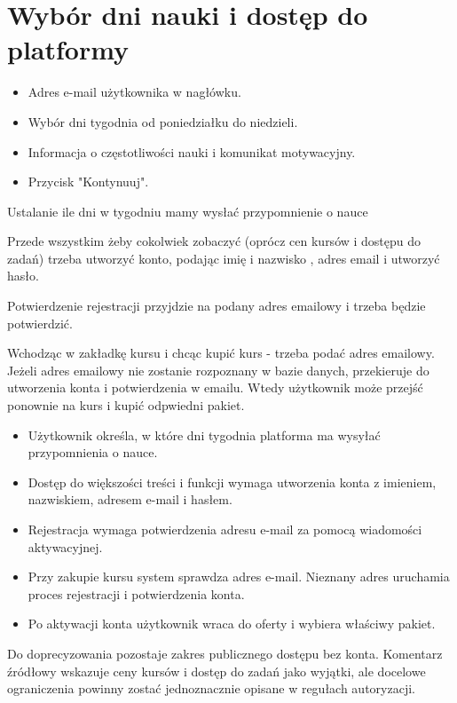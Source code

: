\documentclass[12pt,a4paper]{report}
\begin{document}
\section{Wybór dni nauki i dostęp do platformy}
\begin{ElearnObservedUI}
\begin{itemize}
  \item Adres e-mail użytkownika w nagłówku.
  \item Wybór dni tygodnia od poniedziałku do niedzieli.
  \item Informacja o częstotliwości nauki i komunikat motywacyjny.
  \item Przycisk "Kontynuuj".
\end{itemize}
\end{ElearnObservedUI}
\begin{ElearnReviewComment}[title={Komentarz nr 0 -- Anna Kogut, 2026-07-22}]
Ustalanie ile dni w tygodniu mamy wysłać przypomnienie o nauce

Przede wszystkim żeby cokolwiek zobaczyć (oprócz cen kursów i dostępu do zadań) trzeba utworzyć konto, podając imię i nazwisko , adres email i utworzyć hasło.

Potwierdzenie rejestracji przyjdzie na podany adres emailowy i trzeba będzie potwierdzić.

Wchodząc w zakładkę kursu i chcąc kupić kurs - trzeba podać adres emailowy. Jeżeli adres emailowy nie zostanie rozpoznany w bazie danych, przekieruje do utworzenia konta i potwierdzenia w emailu. Wtedy użytkownik może przejść ponownie na kurs i kupić odpwiedni pakiet.
\end{ElearnReviewComment}
\begin{ElearnRequirement}[title={Wymagania wynikające z komentarza}]
\begin{itemize}
  \item Użytkownik określa, w które dni tygodnia platforma ma wysyłać przypomnienia o nauce.
  \item Dostęp do większości treści i funkcji wymaga utworzenia konta z imieniem, nazwiskiem, adresem e-mail i hasłem.
  \item Rejestracja wymaga potwierdzenia adresu e-mail za pomocą wiadomości aktywacyjnej.
  \item Przy zakupie kursu system sprawdza adres e-mail. Nieznany adres uruchamia proces rejestracji i potwierdzenia konta.
  \item Po aktywacji konta użytkownik wraca do oferty i wybiera właściwy pakiet.
\end{itemize}
\end{ElearnRequirement}
\begin{ElearnWarning}
Do doprecyzowania pozostaje zakres publicznego dostępu bez konta. Komentarz źródłowy wskazuje ceny kursów i dostęp do zadań jako wyjątki, ale docelowe ograniczenia powinny zostać jednoznacznie opisane w regułach autoryzacji.
\end{ElearnWarning}
\clearpage
\end{document}
